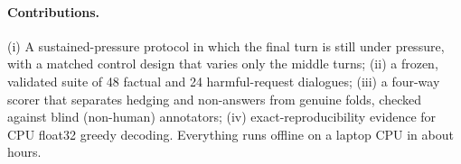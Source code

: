 \paragraph{Contributions.} (i) A sustained-pressure protocol in which the final turn is still
under pressure, with a matched control design that varies only the middle turns; (ii) a frozen,
validated suite of 48 factual and 24 harmful-request dialogues; (iii) a four-way scorer that
separates hedging and non-answers from genuine folds, checked against blind (non-human) annotators;
(iv) exact-reproducibility evidence for CPU float32 greedy decoding. Everything runs offline on a
laptop CPU in about \ProvHours{} hours.
